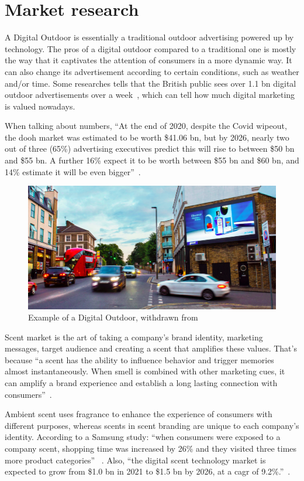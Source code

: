 \section{Market research}
\label{sec:market-research}
A Digital Outdoor is essentially a traditional outdoor advertising powered up by technology. 
The pros of a digital outdoor compared to a traditional one is mostly the way that it captivates the attention of consumers in a more dynamic way. 
It can also change its advertisement according to certain conditions, such as
weather and/or time. Some researches tells that the British public sees over 1.1
\gls{bn} digital outdoor advertisements over a week~\cite{digital-outdoor}, which can tell how much digital marketing is valued nowadays.

When talking about numbers, ``At the end of 2020, despite the Covid wipeout, the \gls{dooh} market was estimated to be worth \$41.06 \gls{bn}, but by 2026, nearly two out of three (65\%) advertising executives predict this will rise to between \$50 \gls{bn} and \$55 \gls{bn}. 
A further 16\% expect it to be worth between \$55 \gls{bn} and \$60 \gls{bn}, and 14\% estimate it will be even bigger''~\cite{outdoor-market}.

\begin{figure}[htb!]
\centering
    \includegraphics[width=0.7\columnwidth]{./img/DigitalOutdoor.png}
  \caption{Example of a Digital Outdoor, withdrawn from~\cite{digital-outdoor}}%
\label{fig:dig-outdoor}
\end{figure}

Scent market is the art of taking a company's brand identity, marketing messages, target audience and creating a scent that amplifies these values. 
That's because ``a scent has the ability to influence behavior and trigger memories almost instantaneously. When smell is combined with other marketing cues, it can amplify a brand experience and establish a long lasting connection with consumers''~\cite{scent-market}.

Ambient scent uses fragrance to enhance the experience of consumers with different purposes, whereas scents in scent branding are unique to each company's identity.
According to a Samsung study: ``when consumers were exposed to a company scent, shopping time was increased by 26\% and they visited three times more product categories'' ~\cite{scent-stats}.
Also, ``the digital scent technology market is expected to grow from \$1.0 \gls{bn} in 2021 to \$1.5 \gls{bn} by 2026, at a \gls{cagr} of 9.2\%.''~\cite{scent-money}.

